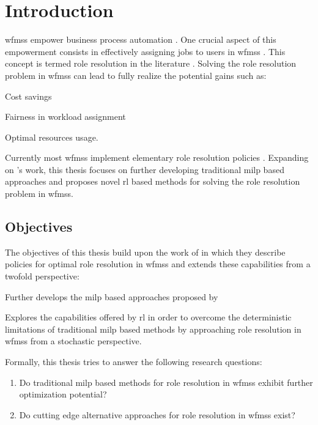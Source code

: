\chapter{Introduction}
\label{ch:intro}

\glspl{wfms} empower business process automation \citep{Zeng2005}. One crucial aspect of this empowerment consists in effectively assigning jobs to users in \glspl{wfms} \citep{Zeng2005}. This concept is termed role resolution in the literature \citep{Cheng2000}. Solving the role resolution problem in \glspl{wfms} can lead to fully realize the potential gains such as:
\begin{enumerate*}
	\item Cost savings
	\item Fairness in workload assignment
	\item Optimal resources usage.
\end{enumerate*}

Currently most \glspl{wfms} implement elementary role resolution policies \citep{Zeng2005}. Expanding on \citet{Zeng2005}'s work, this thesis focuses on further developing traditional \gls{milp} based approaches and proposes novel \gls{rl} based methods for solving the role resolution problem in \glspl{wfms}.


\section{Objectives}
\label{sec:objectives}

The objectives of this thesis build upon the work of \citet{Zeng2005} in which they describe policies for optimal role resolution in \glspl{wfms} and extends these capabilities from a twofold perspective:
\begin{enumerate*}
	\item Further develops the \gls{milp} based approaches proposed by \citet{Zeng2005}
	\item Explores the capabilities offered by \gls{rl} in order to overcome the deterministic limitations of traditional \gls{milp} based methods by approaching role resolution in \glspl{wfms} from a stochastic perspective.
\end{enumerate*}
Formally, this thesis tries to answer the following research questions:

\begin{enumerate}[label=\textbf{Q. \Roman*},ref=Research Question \Roman*]
\item Do traditional \gls{milp} based methods for role resolution in \glspl{wfms} exhibit further optimization potential? \label{rq:one}
\item Do cutting edge alternative approaches for role resolution in \glspl{wfms} exist? \label{rq:two}
\end{enumerate}


